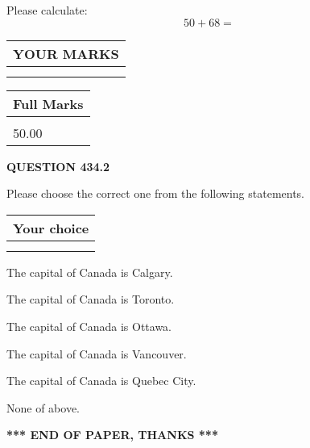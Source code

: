 \documentclass[12pt]{article}
\begin{document}
  
 
Please calculate:
\begin{equation}
50 +  %
68 = \nonumber
\end{equation}
 

 

 
  
\vspace{0.2in}
  
\noindent\begin{tabular}{|l|}
\hline
 YOUR MARKS  \\
\hline
 \\ 
 \\ 
\hline
\end{tabular}
\hspace{0.05in} \begin{tabular}{|l|}
\hline
 Full Marks  \\
\hline
 \\ 
50.00 \\
\hline
\end{tabular}
{\textbf{\Large{QUESTION
434.2 
}}}
  
  
Please choose the correct one from the following statements.
  
  
\noindent\hspace{3.0in} \begin{tabular}{|l|}
\hline
Your choice \\
\hline
 \\ 
 \\ 
\hline
\end{tabular}
  
  
 
 
The capital of Canada is Calgary.
 
 
The capital of Canada is Toronto.
 
 
The capital of Canada is Ottawa.
 
 
The capital of Canada is Vancouver.
 
 
The capital of Canada is Quebec City.
 
 
 None of above.
 
 
   
   
 \vspace{0.2in}
 
   
   
   
   
\vspace{1.0in} 
{\textbf{\large{ *** END OF PAPER, THANKS *** }}} 
   
\end{document}
